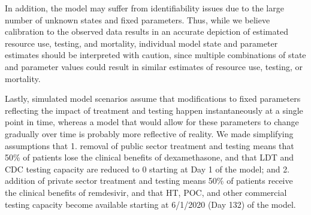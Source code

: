 \documentclass{article}
\begin{document}
In addition, the model may suffer from identifiability issues due to the large number of unknown states and fixed parameters. Thus, while we believe calibration to the observed data results in an accurate depiction of estimated resource use, testing, and mortality, individual model state and parameter estimates should be interpreted with caution, since multiple combinations of state and parameter values could result in similar estimates of resource use, testing, or mortality.

Lastly, simulated model scenarios assume that modifications to fixed parameters reflecting the impact of treatment and testing happen instantaneously at a single point in time, whereas a model that would allow for these parameters to change gradually over time is probably more reflective of reality. We made simplifying assumptions that 1. removal of public sector treatment and testing means that 50\% of patients lose the clinical benefits of dexamethasone, and that LDT and CDC testing capacity are reduced to 0 starting at Day 1 of the model; and 2. addition of private sector treatment and testing means 50\% of patients receive the clinical benefits of remdesivir, and that HT, POC, and other commercial testing capacity become available starting at 6/1/2020 (Day 132) of the model.

\clearpage



\end{document}
